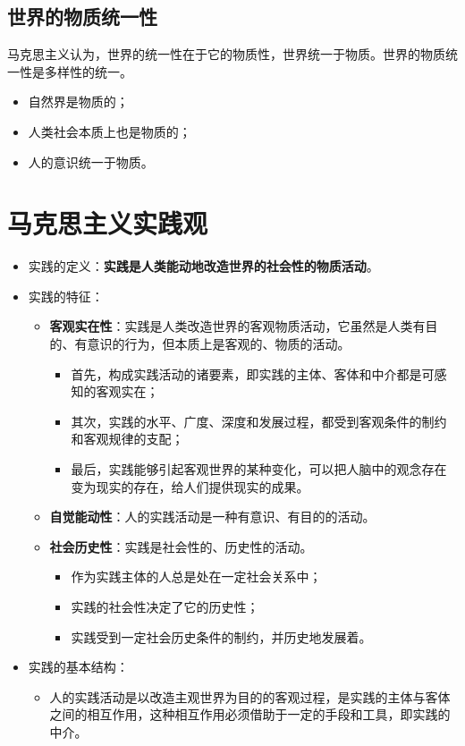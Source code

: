 \documentclass[12pt,openany]{ctexbook}
\begin{document}
\subsection{世界的物质统一性}
马克思主义认为，世界的统一性在于它的物质性，世界统一于物质。世界的物质统一性是多样性的统一。
\begin{itemize}
  \item 自然界是物质的；
  \item 人类社会本质上也是物质的；
  \item 人的意识统一于物质。
\end{itemize}
\section{马克思主义实践观}
\begin{itemize}
  \item 实践的定义：\textbf{实践是人类能动地改造世界的社会性的物质活动}。
  \item 实践的特征：
\begin{itemize}
  \item \textbf{客观实在性}：实践是人类改造世界的客观物质活动，它虽然是人类有目的、有意识的行为，但本质上是客观的、物质的活动。
\begin{itemize}
  \item 首先，构成实践活动的诸要素，即实践的主体、客体和中介都是可感知的客观实在；
  \item 其次，实践的水平、广度、深度和发展过程，都受到客观条件的制约和客观规律的支配；
  \item 最后，实践能够引起客观世界的某种变化，可以把人脑中的观念存在变为现实的存在，给人们提供现实的成果。
\end{itemize}
  \item \textbf{自觉能动性}：人的实践活动是一种有意识、有目的的活动。
  \item \textbf{社会历史性}：实践是社会性的、历史性的活动。
\begin{itemize}
  \item 作为实践主体的人总是处在一定社会关系中；
  \item 实践的社会性决定了它的历史性；
  \item 实践受到一定社会历史条件的制约，并历史地发展着。
\end{itemize}
\end{itemize}
  \item 实践的基本结构：
\begin{itemize}
  \item 人的实践活动是以改造主观世界为目的的客观过程，是实践的主体与客体之间的相互作用，这种相互作用必须借助于一定的手段和工具，即实践的中介。

\end{itemize}
\end{itemize}
\end{document}
